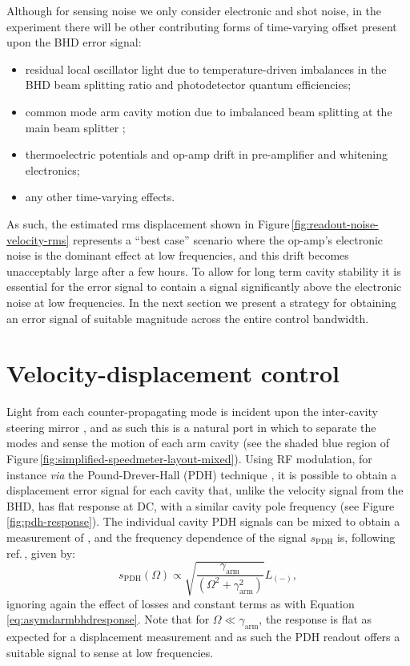 Although for sensing noise we only consider electronic and shot noise, in the experiment there will be other contributing forms of time-varying offset present upon the \gls{BHD} error signal:
\begin{itemize}
  \item residual local oscillator light due to temperature-driven imbalances in the \gls{BHD} beam splitting ratio and photodetector quantum efficiencies;
  \item common mode arm cavity motion due to imbalanced beam splitting at the main beam splitter \cite{Danilishin2015};
  \item thermoelectric potentials and op-amp drift in pre-amplifier and whitening electronics;
  \item any other time-varying effects.
\end{itemize}
As such, the estimated rms displacement shown in Figure\,\ref{fig:readout-noise-velocity-rms} represents a ``best case'' scenario where the op-amp's electronic noise is the dominant effect at low frequencies, and this drift becomes unacceptably large after a few hours. To allow for long term cavity stability it is essential for the error signal to contain a signal significantly above the electronic noise at low frequencies. In the next section we present a strategy for obtaining an error signal of suitable magnitude across the entire control bandwidth.
 
\section{\label{sec:mixed-control}Velocity-displacement control}
   
Light from each counter-propagating mode is incident upon the inter-cavity steering mirror \MINT{}, and as such this is a natural port in which to separate the modes and sense the motion of each arm cavity (see the shaded blue region of Figure\,\ref{fig:simplified-speedmeter-layout-mixed}). Using RF modulation, for instance \emph{via} the Pound-Drever-Hall (\gls{PDH}) technique \cite{Drever1983}, it is possible to obtain a displacement error signal for each cavity that, unlike the velocity signal from the \gls{BHD}, has flat response at \gls{DC}, with a similar cavity pole frequency (see Figure\,\ref{fig:pdh-response}). The individual cavity \gls{PDH} signals can be mixed to obtain a measurement of \LMINUS{}, and the frequency dependence of the signal $s_{\textrm{PDH}}$ is, following ref.\,\cite{Kimble2001}, given by:
\begin{equation}
  \label{eq:m9darmpdhresponse}
  s_{\textrm{PDH}} \left( \Omega \right) \propto \sqrt{\frac{\gamma_{\textrm{arm}}}{\left(\Omega^2 + \gamma_{\textrm{arm}}^2 \right)}} L_{\left(-\right)},
\end{equation}
ignoring again the effect of losses and constant terms as with Equation \ref{eq:asymdarmbhdresponse}. Note that for $\Omega \ll \gamma_{\textrm{arm}}$, the response is flat as expected for a displacement measurement and as such the PDH readout offers a suitable signal to sense \LMINUS{} at low frequencies.

